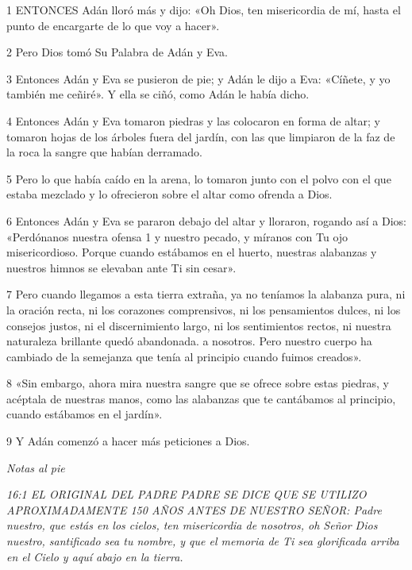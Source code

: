 \par 1 ENTONCES Adán lloró más y dijo: «Oh Dios, ten misericordia de mí, hasta el punto de encargarte de lo que voy a hacer».

\par 2 Pero Dios tomó Su Palabra de Adán y Eva.

\par 3 Entonces Adán y Eva se pusieron de pie; y Adán le dijo a Eva: «Cíñete, y yo también me ceñiré». Y ella se ciñó, como Adán le había dicho.

\par 4 Entonces Adán y Eva tomaron piedras y las colocaron en forma de altar; y tomaron hojas de los árboles fuera del jardín, con las que limpiaron de la faz de la roca la sangre que habían derramado.

\par 5 Pero lo que había caído en la arena, lo tomaron junto con el polvo con el que estaba mezclado y lo ofrecieron sobre el altar como ofrenda a Dios.

\par 6 Entonces Adán y Eva se pararon debajo del altar y lloraron, rogando así a Dios: «Perdónanos nuestra ofensa 1 y nuestro pecado, y míranos con Tu ojo misericordioso. Porque cuando estábamos en el huerto, nuestras alabanzas y nuestros himnos se elevaban ante Ti sin cesar».

\par 7 Pero cuando llegamos a esta tierra extraña, ya no teníamos la alabanza pura, ni la oración recta, ni los corazones comprensivos, ni los pensamientos dulces, ni los consejos justos, ni el discernimiento largo, ni los sentimientos rectos, ni nuestra naturaleza brillante quedó abandonada. a nosotros. Pero nuestro cuerpo ha cambiado de la semejanza que tenía al principio cuando fuimos creados».

\par 8 «Sin embargo, ahora mira nuestra sangre que se ofrece sobre estas piedras, y acéptala de nuestras manos, como las alabanzas que te cantábamos al principio, cuando estábamos en el jardín».

\par 9 Y Adán comenzó a hacer más peticiones a Dios.

\par \textit{Notas al pie}

\par \textit{16:1 EL ORIGINAL DEL PADRE PADRE SE DICE QUE SE UTILIZO APROXIMADAMENTE 150 AÑOS ANTES DE NUESTRO SEÑOR: Padre nuestro, que estás en los cielos, ten misericordia de nosotros, oh Señor Dios nuestro, santificado sea tu nombre, y que el memoria de Ti sea glorificada arriba en el Cielo y aquí abajo en la tierra.}


